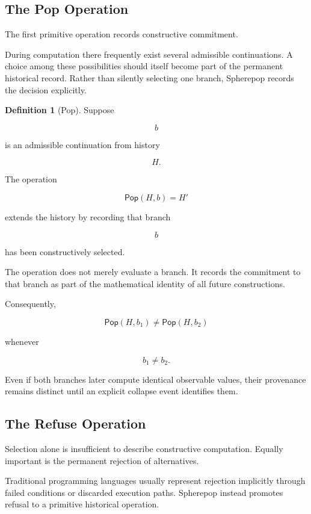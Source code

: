 \documentclass[12pt,oneside]{article}
\theoremstyle{definition}
\newtheorem{definition}[theorem]{Definition}
\theoremstyle{remark}
\newcommand{\Pop}{\mathsf{Pop}}
\begin{document}
\subsection{The Pop Operation}

The first primitive operation records constructive commitment.

During computation there frequently exist several admissible continuations. A
choice among these possibilities should itself become part of the permanent
historical record. Rather than silently selecting one branch, Spherepop records
the decision explicitly.

\begin{definition}[Pop]

Suppose

\[
b
\]

is an admissible continuation from history

\[
H.
\]

The operation

\[
\Pop(H,b)
=
H'
\]

extends the history by recording that branch

\[
b
\]

has been constructively selected.

\end{definition}

The operation does not merely evaluate a branch. It records the commitment to
that branch as part of the mathematical identity of all future constructions.

Consequently,

\[
\Pop(H,b_1)
\neq
\Pop(H,b_2)
\]

whenever

\[
b_1\neq b_2.
\]

Even if both branches later compute identical observable values, their
provenance remains distinct until an explicit collapse event identifies them.

\subsection{The Refuse Operation}

Selection alone is insufficient to describe constructive computation. Equally
important is the permanent rejection of alternatives.

Traditional programming languages usually represent rejection implicitly through
failed conditions or discarded execution paths. Spherepop instead promotes
refusal to a primitive historical operation.
\end{document}
